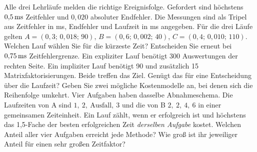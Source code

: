 Alle drei Lehrläufe melden die richtige Ereignisfolge. Gefordert sind höchstens \(0{,}5\,\mathrm{ms}\) Zeitfehler und \(0{,}020\) absoluter Endfehler. Die Messungen sind als Tripel aus Zeitfehler in ms, Endfehler und Laufzeit in ms angegeben. Für die drei Läufe gelten \(A=(0{,}3;\,0{,}018;\,90)\), \(B=(0{,}6;\,0{,}002;\,40)\), \(C=(0{,}4;\,0{,}010;\,110)\). Welchen Lauf wählen Sie für die kürzeste Zeit? Entscheiden Sie erneut bei \(0{,}75\,\mathrm{ms}\) Zeitfehlergrenze.
Ein expliziter Lauf benötigt 300 Auswertungen der rechten Seite. Ein impliziter Lauf benötigt 90 und zusätzlich 15 Matrixfaktorisierungen. Beide treffen das Ziel. Genügt das für eine Entscheidung über die Laufzeit? Geben Sie zwei mögliche Kostenmodelle an, bei denen sich die Reihenfolge umkehrt.
Vier Aufgaben haben dasselbe Abnahmeschema. Die Laufzeiten von A sind \(1,\ 2,\ \text{Ausfall},\ 3\) und die von B \(2,\ 2,\ 4,\ 6\) in einer gemeinsamen Zeiteinheit. Ein Lauf zählt, wenn er erfolgreich ist und höchstens das 1,5-Fache der besten erfolgreichen Zeit \emph{derselben Aufgabe} kostet. Welchen Anteil aller vier Aufgaben erreicht jede Methode? Wie groß ist ihr jeweiliger Anteil für einen sehr großen Zeitfaktor?

\schreibfeld



